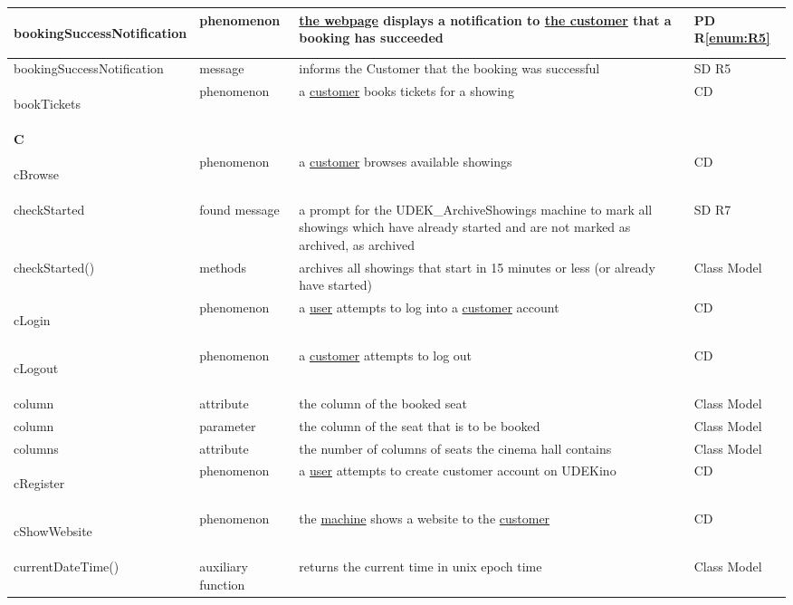 \documentclass[a4paper,10pt,titlepage,bibtotoc,bibtotocnumbered]{scrreprt}
\begin{document}
\begin{longtable}{|p{4cm}|p{3cm}|p{5cm}|l|}
\hline
\hypertarget{glossary:bookingSuccessNotification}{bookingSuccessNotification} & phenomenon & \hyperlink{glossary:WebpageBookTickets}{the webpage} displays a notification to \hyperlink{glossary:Customer}{the customer} that a booking has succeeded & PD R\ref{enum:R5}\\
\hline
bookingSuccessNotification & message & informs the Customer that the booking was successful & SD R5\\
\hline
\hypertarget{glossary:bookTickets}{bookTickets} & phenomenon & a \hyperlink{glossary:Customer}{customer} books tickets for a showing & CD\\
\hline
\multicolumn{4}{|l|}{\textbf{C}}\\
\hline
\hypertarget{glossary:cBrowse}{cBrowse} & phenomenon & a \hyperlink{glossary:Customer}{customer} browses available showings & CD\\
\hline
checkStarted & found message & a prompt for the UDEK\_ArchiveShowings machine to mark all showings which have already started and are not marked as archived, as archived & SD R7\\
\hline
checkStarted() & methods & archives all showings that start in 15 minutes or less (or already have started) & Class Model\\
\hline
\hypertarget{glossary:cLogin}{cLogin} & phenomenon & a \hyperlink{glossary:User}{user} attempts to log into a \hyperlink{glossary:Customer}{customer} account & CD\\
\hline
\hypertarget{glossary:cLogout}{cLogout} & phenomenon & a \hyperlink{glossary:Customer}{customer} attempts to log out & CD\\
\hline
column & attribute & the column of the booked seat & Class Model\\
\hline
column & parameter & the column of the seat that is to be booked & Class Model\\
\hline
columns & attribute & the number of columns of seats the cinema hall contains & Class Model\\
\hline
\hypertarget{glossary:cRegister}{cRegister} & phenomenon & a \hyperlink{glossary:User}{user} attempts to create customer account on UDEKino & CD\\
\hline
\hypertarget{glossary:cShowWebsite}{cShowWebsite} & phenomenon & the \hyperlink{glossary:UDEKino}{machine} shows a website to the \hyperlink{glossary:Customer}{customer} & CD\\
\hline
currentDateTime() & auxiliary function & returns the current time in unix epoch time & Class Model\\

\end{longtable}
\end{document}
